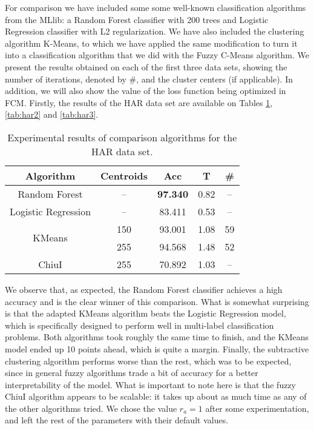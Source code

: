 For comparison we have included some some well-known classification algorithms from the MLlib: a Random Forest classifier with 200 trees and Logistic Regression classifier with L2 regularization. We have also included the clustering algorithm K-Means, to which we have applied the same modification to turn it into a classification algorithm that we did with the Fuzzy C-Means algorithm. We present the results obtained on each of the first three data sets, showing the number of iterations, denoted by \#, and the cluster centers (if applicable). In addition, we will also show the value of the loss function being optimized in FCM. Firstly, the results of the HAR data set are available on Tables \ref{tab:har1}, \ref{tab:har2} and \ref{tab:har3}.

\begin{table}[h!]
  \centering
\caption{Experimental results of comparison algorithms for the HAR data set.}
\label{tab:har1}
\begin{tabular}{ccccc}
\toprule
Algorithm & Centroids & Acc& T & \# \\ \midrule
Random Forest & -- & \textbf{97.340} & 0.82 & -- \\
Logistic Regression & --& 83.411 & 0.53 & -- \\
\multirow{2}{*}{KMeans} & 150 & 93.001 & 1.08 & 59 \\
& 255 & 94.568 &  1.48 & 52\\
ChiuI & 255 & 70.892 &  1.03 & -- \\ \bottomrule
\end{tabular}
\end{table}

We observe that, as expected, the Random Forest classifier achieves a high accuracy and is the clear winner of this comparison. What is somewhat surprising is that the adapted KMeans algorithm beats the Logistic Regression model, which is specifically designed to perform well in multi-label classification problems. Both algorithms took roughly the same time to finish, and the KMeans model ended up 10 points ahead, which is quite a margin. Finally, the subtractive clustering algorithm performs worse than the rest, which was to be expected, since in general fuzzy algorithms trade a bit of accuracy for a better interpretability of the model. What is important to note here is that the fuzzy ChiuI algorithm appears to be scalable: it takes up about as much time as any of the other algorithms tried. We chose the value $r_a=1$ after some experimentation, and left the rest of the parameters with their default values.

